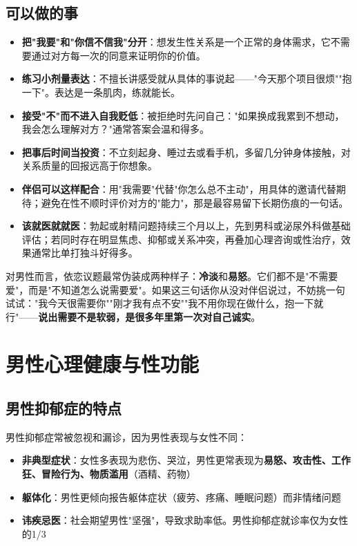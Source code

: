 \subsection{可以做的事}

\begin{itemize}
	\item \textbf{把"我要"和"你信不信我"分开}：想发生性关系是一个正常的身体需求，它不需要通过对方每一次的同意来证明你的价值。
	\item \textbf{练习小剂量表达}：不擅长讲感受就从具体的事说起——"今天那个项目很烦""抱一下"。表达是一条肌肉，练就能长。
	\item \textbf{接受"不"而不进入自我贬低}：被拒绝时先问自己："如果换成我累到不想动，我会怎么理解对方？"通常答案会温和得多。
	\item \textbf{把事后时间当投资}：不立刻起身、睡过去或看手机，多留几分钟身体接触，对关系质量的回报远高于你想象。
	\item \textbf{伴侣可以这样配合}：用"我需要"代替"你怎么总不主动"，用具体的邀请代替期待；避免在性不顺时评价对方的"能力"，那是最容易留下长期伤痕的一句话。
	\item \textbf{该就医就就医}：勃起或射精问题持续三个月以上，先到男科或泌尿外科做基础评估；若同时存在明显焦虑、抑郁或关系冲突，再叠加心理咨询或性治疗，效果通常比单打独斗好得多。
\end{itemize}

\begin{tcolorbox}[colback=pink!5!white,colframe=red!50!black,title=贴心小叮咛]
对男性而言，依恋议题最常伪装成两种样子：\textbf{冷淡}和\textbf{易怒}。它们都不是"不需要爱"，而是"不知道怎么说需要爱"。如果这三句话你从没对伴侣说过，不妨挑一句试试："我今天很需要你""刚才我有点不安""我不用你现在做什么，抱一下就行"——\textbf{说出需要不是软弱，是很多年里第一次对自己诚实}。
\end{tcolorbox}

\section{男性心理健康与性功能}
\label{sec:male_mental_health}

\subsection{男性抑郁症的特点}

男性抑郁症常被忽视和漏诊，因为男性表现与女性不同：

\begin{itemize}[leftmargin=2cm]
	\item \textbf{非典型症状}：女性多表现为悲伤、哭泣，男性更常表现为\textbf{易怒、攻击性、工作狂、冒险行为、物质滥用}（酒精、药物）
	\item \textbf{躯体化}：男性更倾向报告躯体症状（疲劳、疼痛、睡眠问题）而非情绪问题
	\item \textbf{讳疾忌医}：社会期望男性"坚强"，导致求助率低。男性抑郁症就诊率仅为女性的1/3
\end{itemize}

